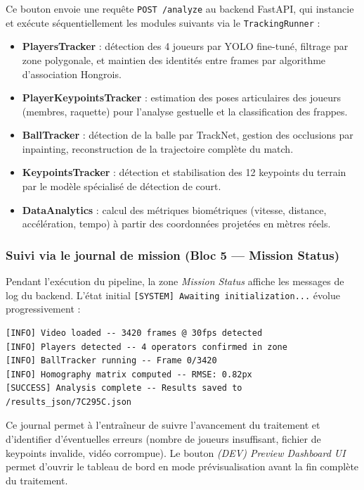 Ce bouton envoie une requête \texttt{POST /analyze} au backend FastAPI, qui instancie et
exécute séquentiellement les modules suivants via le \texttt{TrackingRunner} :
 
\begin{itemize}[leftmargin=1.5em]
  \item \textbf{PlayersTracker} : détection des 4 joueurs par YOLO fine-tuné, filtrage par
        zone polygonale, et maintien des identités entre frames par algorithme d'association
        Hongrois.
  \item \textbf{PlayerKeypointsTracker} : estimation des poses articulaires des joueurs
        (membres, raquette) pour l'analyse gestuelle et la classification des frappes.
  \item \textbf{BallTracker} : détection de la balle par TrackNet, gestion des occlusions
        par inpainting, reconstruction de la trajectoire complète du match.
  \item \textbf{KeypointsTracker} : détection et stabilisation des 12 keypoints du terrain
        par le modèle spécialisé de détection de court.
  \item \textbf{DataAnalytics} : calcul des métriques biométriques (vitesse, distance,
        accélération, tempo) à partir des coordonnées projetées en mètres réels.
\end{itemize}
 
\subsubsection*{Suivi via le journal de mission (Bloc 5 — Mission Status)}
 
Pendant l'exécution du pipeline, la zone \textit{Mission Status} affiche  les
messages de log du backend. L'état initial \texttt{[SYSTEM] Awaiting initialization...}
évolue progressivement :
 
\begin{lstlisting}[basicstyle=\small\ttfamily, backgroundcolor=\color{black!5},
                   frame=single, breaklines=true]
[INFO] Video loaded -- 3420 frames @ 30fps detected
[INFO] Players detected -- 4 operators confirmed in zone
[INFO] BallTracker running -- Frame 0/3420
[INFO] Homography matrix computed -- RMSE: 0.82px
[SUCCESS] Analysis complete -- Results saved to /results_json/7C295C.json
\end{lstlisting}
 
Ce journal permet à l'entraîneur de suivre l'avancement du traitement et d'identifier
d'éventuelles erreurs (nombre de joueurs insuffisant, fichier de keypoints invalide, vidéo
corrompue). Le bouton \textit{(DEV) Preview Dashboard UI} permet d'ouvrir le tableau de bord
en mode prévisualisation avant la fin complète du traitement.
 
